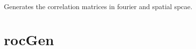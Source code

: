 \documentclass[letterpaper,10pt,english]{sphinxmanual}
\begin{document}
\begin{fulllineitems}
\begin{fulllineitems}
\end{fulllineitems}


\begin{fulllineitems}
\label{\detokenize{gaussClass:gaussClass.GaussianRandomField.gen_correlation}}
\sphinxAtStartPar
Generates the correlation matrices in fourier and spatial spcae.

\end{fulllineitems}


\end{fulllineitems}



\chapter{rocGen}
\label{\detokenize{rocGen:rocgen}}\label{\detokenize{rocGen:id1}}\label{\detokenize{rocGen::doc}}\label{\detokenize{rocGen:module-rocGen}}
\end{document}
